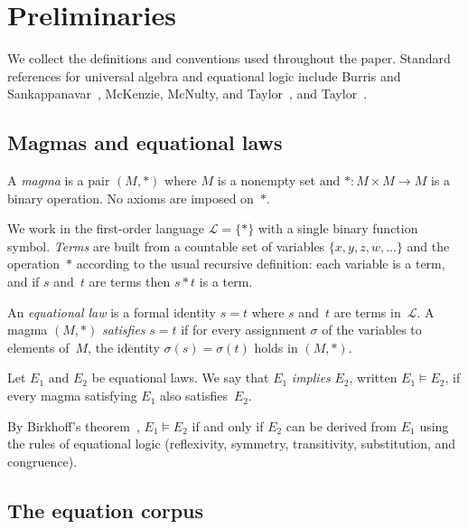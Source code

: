 \section{Preliminaries}\label{sec:prelim}

We collect the definitions and conventions used throughout the paper.
Standard references for universal algebra and equational
logic include Burris and Sankappanavar~\cite{burris1981course},
McKenzie, McNulty, and Taylor~\cite{mckenzie1987algebras},
and Taylor~\cite{taylor1979equational}.

\subsection{Magmas and equational laws}

\begin{definition}\label{def:magma}
A \emph{magma} is a pair $(M, *)$ where $M$ is a nonempty set and
$* \colon M \times M \to M$ is a binary operation.  No axioms are
imposed on~$*$.
\end{definition}

We work in the first-order language $\mathcal{L} = \{*\}$ with a
single binary function symbol.  \emph{Terms} are built from a countable
set of variables $\{x, y, z, w, \ldots\}$ and the operation~$*$
according to the usual recursive definition: each variable is a term,
and if $s$ and~$t$ are terms then $s * t$ is a term.

\begin{definition}\label{def:eq-law}
An \emph{equational law} is a formal identity $s = t$ where $s$
and~$t$ are terms in~$\mathcal{L}$.  A magma $(M,*)$ \emph{satisfies}
$s = t$ if for every assignment $\sigma$ of the variables to elements
of~$M$, the identity $\sigma(s) = \sigma(t)$ holds in $(M,*)$.
\end{definition}

\begin{definition}\label{def:implication}
Let $E_1$ and $E_2$ be equational laws.  We say that $E_1$
\emph{implies} $E_2$, written $E_1 \models E_2$, if every magma
satisfying $E_1$ also satisfies~$E_2$.
\end{definition}

By Birkhoff's theorem~\cite{birkhoff1935structure}, $E_1 \models E_2$
if and only if $E_2$ can be derived from $E_1$ using the rules of
equational logic (reflexivity, symmetry, transitivity, substitution,
and congruence).

\subsection{The equation corpus}

